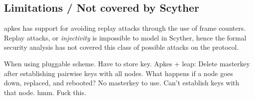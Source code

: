 \subsection{Limitations / Not covered by Scyther}


\gls{apkes} has support for avoiding replay attacks through the use of frame counters. Replay attacks, or \emph{injectivity} is impossible to model in Scyther, hence the formal security analysis has not covered this class of possible attacks on the protocol. 

When using pluggable scheme. Have to store key. Apkes + leap: Delete masterkey after establishing pairwise keys with all nodes. What happens if a node goes down, replaced, and rebooted? No masterkey to use. Can't establish keys with that node. hmm. Fuck this.











